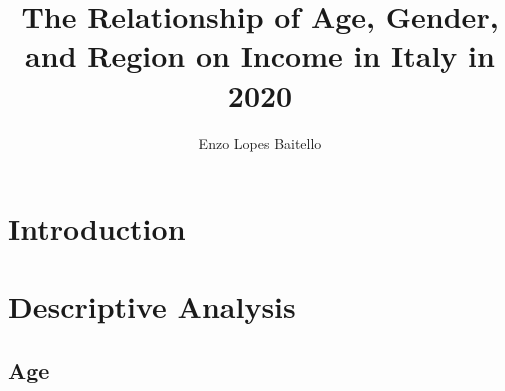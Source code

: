 \documentclass[12pt]{article}
\title{The Relationship of Age, Gender, and Region on Income in Italy in 2020}
\author{Enzo Lopes Baitello}
\begin{document}
\maketitle

\clearpage
\tableofcontents

\clearpage
\section{Introduction}

\section{Descriptive Analysis}

\subsection{Age}
\end{document}
